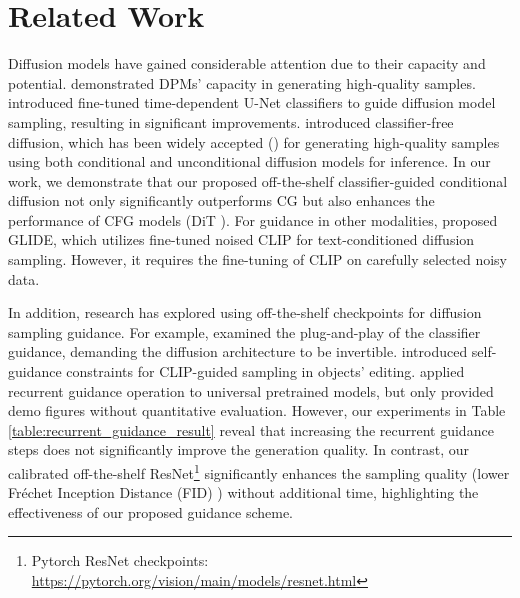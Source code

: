 \documentclass{article}
\theoremstyle{definition}
\begin{document}
\section{Related Work}
Diffusion models have gained considerable attention due to their capacity and potential. \cite{ho2020denoising,nichol2021improved,song2020denoising,peebles2022scalable,karras2022edm} demonstrated DPMs' capacity in generating high-quality samples. 
\cite{dhariwal2021diffusion} introduced fine-tuned time-dependent U-Net \citep{ronneberger2015u} classifiers to guide diffusion model sampling, resulting in significant improvements. 
\cite{ho2022classifier} introduced classifier-free diffusion, which has been widely accepted (\cite{rombach2022high,peebles2022scalable,ramesh2022hierarchical}) for generating high-quality samples using both conditional and unconditional diffusion models for inference.
In our work, we demonstrate that our proposed off-the-shelf classifier-guided conditional diffusion not only significantly outperforms CG but also enhances the performance of CFG models (DiT \cite{peebles2022scalable}).  
For guidance in other modalities, \cite{nichol2021glide} proposed GLIDE, which utilizes fine-tuned noised CLIP for text-conditioned diffusion sampling. However, it requires the fine-tuning of CLIP on carefully selected noisy data.

In addition, research has explored using off-the-shelf checkpoints for diffusion sampling guidance. For example, \cite{wallace2023end} examined the plug-and-play of the classifier guidance, demanding the diffusion architecture to be invertible.  
\cite{epstein2023diffusion} introduced self-guidance constraints for CLIP-guided sampling in objects' editing. 
\cite{bansal2023universal} applied recurrent guidance operation to universal pretrained models, but only provided demo figures without quantitative evaluation. However, our experiments in Table \ref{table:recurrent_guidance_result} reveal that increasing the recurrent guidance steps does not significantly improve the generation quality. In contrast, our calibrated off-the-shelf ResNet\footnote{Pytorch ResNet checkpoints: \url{https://pytorch.org/vision/main/models/resnet.html}} significantly enhances the sampling quality (lower Fréchet Inception Distance (FID) \citep{heusel2017gans}) without additional time, highlighting the effectiveness of our proposed guidance scheme.
\end{document}
